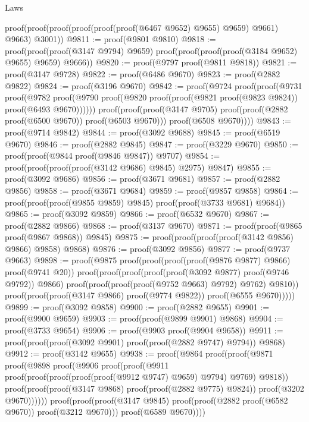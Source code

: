 \begin{lexlean}{Laws}
\begin{coremodule}
      proof(proof(proof(proof(proof(proof(@6467 @9652) @9655) @9659) @9661) @9663) @3001))
@9811 := proof(@9801 @9810)
@9818 := proof(proof(proof(@3147 @9794) @9659)
      proof(proof(proof(proof(@3184 @9652) @9655) @9659) @9666))
@9820 := proof(@9797 proof(@9811 @9818))
@9821 := proof(@3147 @9728)
@9822 := proof(@6486 @9670)
@9823 := proof(@2882 @9822)
@9824 := proof(@3196 @9670)
@9842 := proof(@9724
      proof(proof(@9731
            proof(@9782
                proof(@9790
                    proof(@9820 proof(proof(@9821 proof(@9823 @9824)) proof(@6493 @9670))))))
          proof(proof(proof(@3147 @9705) proof(proof(@2882 proof(@6500 @9670)) proof(@6503 @9670)))
              proof(@6508 @9670))))
@9843 := proof(@9714 @9842)
@9844 := proof(@3092 @9688)
@9845 := proof(@6519 @9670)
@9846 := proof(@2882 @9845)
@9847 := proof(@3229 @9670)
@9850 := proof(proof(@9844 proof(@9846 @9847)) @9707)
@9854 := proof(proof(proof(proof(@3142 @9686) @9845) @2975) @9847)
@9855 := proof(@3092 @9686)
@9856 := proof(@3671 @9681)
@9857 := proof(@2882 @9856)
@9858 := proof(@3671 @9684)
@9859 := proof(@9857 @9858)
@9864 := proof(proof(proof(@9855 @9859) @9845) proof(proof(@3733 @9681) @9684))
@9865 := proof(@3092 @9859)
@9866 := proof(@6532 @9670)
@9867 := proof(@2882 @9866)
@9868 := proof(@3137 @9670)
@9871 := proof(proof(@9865 proof(@9867 @9868)) @9845)
@9875 := proof(proof(proof(proof(@3142 @9856) @9866) @9858) @9868)
@9876 := proof(@3092 @9856)
@9877 := proof(@9737 @9663)
@9898 := proof(@9875
      proof(proof(proof(proof(@9876 @9877) @9866) proof(@9741 @20))
          proof(proof(proof(proof(proof(@3092 @9877) proof(@9746 @9792)) @9866)
                proof(proof(proof(proof(@9752 @9663) @9792) @9762) @9810))
              proof(proof(proof(@3147 @9866) proof(@9774 @9822)) proof(@6555 @9670)))))
@9899 := proof(@3092 @9858)
@9900 := proof(@2882 @9655)
@9901 := proof(@9900 @9659)
@9903 := proof(proof(@9899 @9901) @9868)
@9904 := proof(@3733 @9654)
@9906 := proof(@9903 proof(@9904 @9658))
@9911 := proof(proof(proof(@3092 @9901) proof(proof(@2882 @9747) @9794)) @9868)
@9912 := proof(@3142 @9655)
@9938 := proof(@9864
      proof(proof(@9871
            proof(@9898
                proof(@9906
                    proof(proof(@9911
                          proof(proof(proof(proof(proof(@9912 @9747) @9659) @9794) @9769) @9818))
                        proof(proof(proof(@3147 @9868) proof(proof(@2882 @9775) @9824))
                            proof(@3202 @9670))))))
          proof(proof(proof(@3147 @9845) proof(proof(@2882 proof(@6582 @9670)) proof(@3212 @9670)))
              proof(@6589 @9670))))

\end{coremodule}
\end{lexlean}
